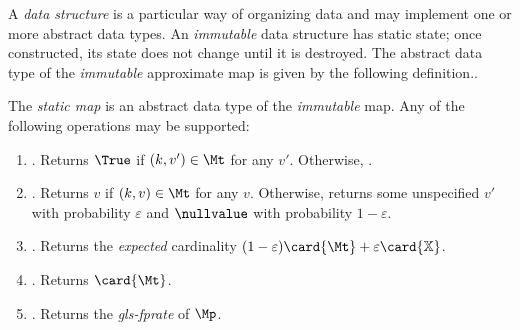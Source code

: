 \documentclass[ ../main.tex]{subfiles}
\begin{document}
A \emph{data structure} is a particular way of organizing data and may implement one or more abstract data types. An \emph{immutable} data structure has static state; once constructed, its state does not change until it is destroyed. The abstract data type of the \emph{immutable} approximate map is given by the following definition..
\begin{definition}
The \emph{static map} is an abstract data type of the \emph{immutable} map. Any of the following operations may be supported:
\begin{enumerate}
    \item {}. Returns $\True$ if $(k,v') \in \Mt$ for any $v'$. Otherwise, \False.
    \item {}. Returns $v$ if $(k,v) \in \Mt$ for any $v$. Otherwise, returns some unspecified $v'$ with probability $\varepsilon$ and $\nullvalue$ with probability $1 - \varepsilon$.
    \item \Cardinality{$\Mp$}. Returns the \emph{expected} cardinality $(1 - \varepsilon) \card{\Mt} + \varepsilon \card{\mathbb{X}}$.
    \item \Count{$\Mt$}. Returns $\card{\Mt}$.
    \item \fprate{$\Mp$}. Returns the \emph{\gls{gls-fprate}} of $\Mp$.
\end{enumerate}
\end{definition}
\end{document}
